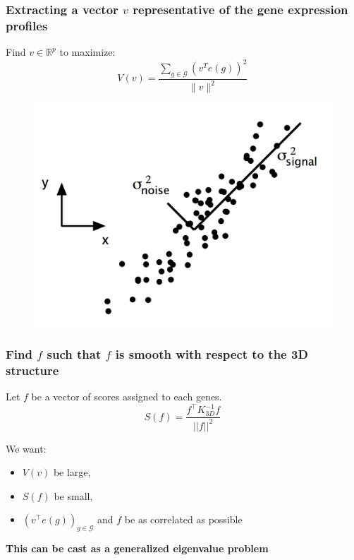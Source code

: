 \documentclass[xcolor=dvipsnames]{beamer}
\begin{document}
\begin{frame}
\frametitle{Extracting a vector $v$ representative of the gene expression
profiles}
Find $v \in \mathbb{R}^p$ to maximize:
\begin{equation*}\label{eq:variance}
V(v) = \frac{\sum_{g \in \mathcal{G}} \left(v^T e(g)\right)^2}{\|v\|^2}\,
\end{equation*}

\begin{figure}
\includegraphics[width=0.5\linewidth]{figures/pca.png}
\end{figure}
\end{frame}

\begin{frame}
\frametitle{Find $f$ such that $f$ is smooth with respect to the 3D structure}
Let $f$ be a vector of scores assigned to each genes. \\
\begin{equation*}\label{eq:smoothness}
S(f) = \frac{f^\top K^{-1}_{3D} f}{||f||^2}\,
\end{equation*}

\vspace{1em}
We want:
\begin{itemize}[label={$\bullet$}]
\item $V(v)$ be large,
\item $S(f)$ be small,
\item $\left(v^\top e(g)\right)_{g\in\mathcal{G}}$ and $f$ be as correlated as possible
\end{itemize}

\vspace{1em}
\begin{center}
{\color{Blue} \bf This can be cast as a generalized eigenvalue problem}
\end{center}

\end{frame}
\end{document}
